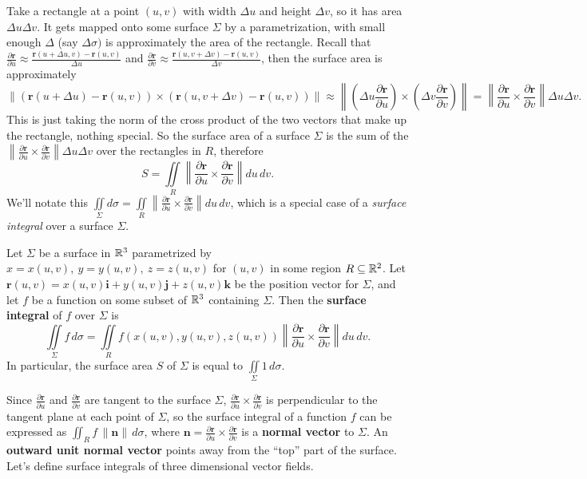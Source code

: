 Take a rectangle at a point $(u,v)$ with width $\Delta u$ and height $\Delta v$, so it has area $\Delta u\Delta v$. It gets mapped onto some surface $\Sigma$ by a parametrization, with small enough $\Delta $ (say $\Delta \sigma)$ is approximately the area of the rectangle. Recall that $\frac{\partial \mathbf r}{\partial u}\approx \frac{\mathbf r(u+\Delta u,v)-\mathbf r(u,v)}{\Delta u}$ and $\frac{\partial \mathbf r}{\partial v}\approx \frac{\mathbf r(u,v+\Delta v)-\mathbf r(u,v)}{\Delta v}$, then the surface area is approximately \[
    \|(\mathbf r(u+\Delta u)-\mathbf r(u,v))\times (\mathbf r(u,v+\Delta v)-\mathbf r(u,v))\|\approx \left\| \left( \Delta u\frac{\partial \mathbf r}{\partial u} \right) \times \left( \Delta v \frac{\partial \mathbf r}{\partial v} \right)\right\| =\left\| \frac{\partial \mathbf r}{\partial u}\times \frac{\partial \mathbf r}{\partial v}\right\| \Delta u\Delta v.
\] This is just taking the norm of the cross product of the two vectors that make up the rectangle, nothing special. So the surface area of a surface $\Sigma$ is the sum of the $\left\| \frac{\partial \mathbf r}{\partial u}\times \frac{\partial \mathbf r}{\partial v}\right\| \Delta u\Delta v $ over the rectangles in $R$, therefore \[
S = \iint\limits_R \left\| \frac{\partial \mathbf r}{\partial u}\times \frac{\partial \mathbf r}{\partial v}\right\| du\,dv.
\] We'll notate this $\iint\limits_{\Sigma}d\sigma=\iint\limits_R \left\| \frac{\partial \mathbf r}{\partial u}\times \frac{\partial \mathbf r}{\partial v}\right\| du\,dv$, which is a special case of a \emph{surface integral} over a surface $\Sigma$.
\begin{definition}[]
    Let $\Sigma$ be a surface in $\mathbb{R}^3$ parametrized by $x=x(u,v),\ y=y(u,v), \ z=z(u,v)$ for $(u,v)$ in some region $R\subseteq \mathbb{R}^2$. Let $\mathbf r(u,v)=x(u,v) \mathbf i+y(u,v) \mathbf j+z(u,v)\mathbf k$ be the position vector for $\Sigma$, and let $f$ be a function on some subset of $\mathbb{R}^3$ containing $\Sigma$. Then the \textbf{surface integral} of $f$ over $\Sigma$ is \[
        \iint\limits_{\Sigma}f \, d\sigma =\iint\limits_R f(x(u,v),y(u,v),z(u,v)) \left\| \frac{\partial \mathbf r}{\partial u}\times \frac{\partial \mathbf r}{\partial v}\right\| du\,dv.
    \] In particular, the surface area $S$ of $\Sigma$ is equal to $\iint\limits_{\Sigma}1 \, d\sigma$.
\end{definition}
Since $\frac{\partial \mathbf r}{\partial u}$ and $\frac{\partial \mathbf r}{\partial v}$ are tangent to the surface $\Sigma$, $\frac{\partial \mathbf r}{\partial u}\times \frac{\partial \mathbf r}{\partial v}$ is perpendicular to the tangent plane at each point of $\Sigma$, so the surface integral of a function $f$ can be expressed as $\iint_R f \, \|\mathbf n\|\,d\sigma$, where $\mathbf n=\frac{\partial \mathbf r}{\partial u}\times \frac{\partial \mathbf r}{\partial v}$ is a \textbf{normal vector} to $\Sigma$. An \textbf{outward unit normal vector} points away from the ``top'' part of the surface. Let's define surface integrals of three dimensional vector fields.
